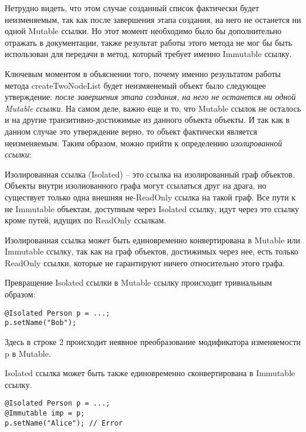 Нетрудно видеть, что этом случае созданный список фактически будет неизменяемым, так как после завершения этапа создания, на него не останется ни одной Mutable ссылки. Но этот момент необходимо было бы дополнительно отражать в документации, также результат работы этого метода не мог бы быть использован для передачи в метод, который требует именно Immutable ссылку. 

Ключевым моментом в объяснении того, почему именно результатом работы метода createTwoNodeList будет неизмяенемый объект было следующее утверждение: \textit{после завершения этапа создания, на него не останется ни одной Mutable ссылки}. На самом деле, важно еще и то, что Mutable ссылок не осталось и на другие транзитивно-достижимые из данного объекта объекты. И так как в данном случае это утверждение верно, то объект фактически является неизменяемым. Таким образом, можно прийти к определению \textit{изолированной ссылки}:

\begin{Def}\label{isolated_ref}
Изолированная ссылка (Isolated) -- это ссылка на изолированный граф объектов. Объекты внутри изолиованного графа могут ссылаться друг на драга, но существует только одна внешняя не-ReadOnly ссылка на такой граф. Все пути к не Immutable объектам, доступным через Isolated ссылку, идут через это ссылку кроме путей, идущих по ReadOnly ссылкам.
\end{Def}

Изолированная ссылка может быть единовременно конвертирована в Mutable или Immutable ссылку, так как на граф объектов, достижимых через нее, есть только ReadOnly ссылки, которые не гарантируют ничего относительно этого графа. 

Превращение Isolated ссылки в Mutable ссылку происходит тривиальным образом:

\begin{lstlisting}[caption=Превращение Isolated ссылки в Mutable, label=code:isolated_to_mutable]
@Isolated Person p = ...;
p.setName("Bob");
\end{lstlisting} 

Здесь в строке 2 происходит неявное преобразование модификатора изменяемости p в Mutable.

Isolated ссылка может быть также единовременно сконвертирована в Immutable ссылку.

\begin{lstlisting}[caption=Превращение Isolated ссылки в immutable, label=code:isolated_to_immutable]
@Isolated Person p = ...;
@Immutable imp = p;
p.setName("Alice"); // Error
\end{lstlisting} 

